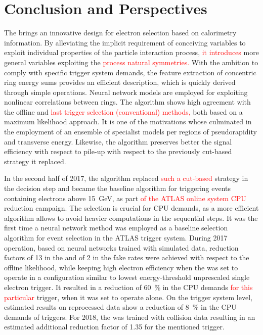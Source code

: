 \chapter{Conclusion and Perspectives}\label{sec:conclusion}






The \rnn{} brings an innovative design for electron selection based on
calorimetry information. By alleviating the implicit requirement of conceiving
variables to exploit individual properties of the particle interaction process, \textcolor{red}{it introduces} 
more general variables exploiting the \textcolor{red}{process natural symmetries.} With the
ambition to comply with specific trigger system demands, the feature extraction
of concentric ring energy sums provides an efficient description, which is quickly derived
through simple operations. Neural network models are employed for exploiting
nonlinear correlations between rings. The algorithm shows
high agreement with the offline and \textcolor{red}{last trigger selection (conventional) methods,} both based
on a maximum likelihood approach. It is one of the motivations whose culminated
in the employment of an ensemble of specialist models per regions of
pseudorapidity and transverse energy. Likewise, the \rnn{} algorithm preserves
better the signal efficiency with respect to pile-up with respect to the
previously cut-based strategy it replaced.



In the second half of 2017, the \rnn{} algorithm replaced \textcolor{red}{such a cut-based} strategy
in the \fastcalo{} decision step and became the baseline algorithm
for triggering events containing electrons above \SI{15}{\GeV}, as part \textcolor{red}{of the ATLAS online system CPU} reduction campaign. The \fastcalo{} selection is crucial for CPU demands, as a more
efficient algorithm allows to avoid heavier computations in the
sequential steps.  It was the first time a neural network method was employed as
a baseline selection algorithm for event selection in the ATLAS trigger system.
During 2017 operation, based on neural networks trained with simulated data,
reduction factors of 13 in the \fastcalo{} and of 2 in
the \hlt{} fake rates were achieved with respect to the offline likelihood, while
keeping high electron efficiency when the \rnn{} was set to operate in a
configuration similar to lowest energy-threshold unprescaled single electron
trigger. It resulted in a reduction of \SI{60}{\%} in the CPU demands \textcolor{red}{for this particular} trigger, when it was set to operate alone. On the trigger system level,
estimated results on reprocessed data show a reduction of \SI{8}{\%} in the CPU
demands of \egamma{} triggers. For 2018, the \rnn{} was trained with collision
data resulting in an estimated additional reduction factor of 1.35 for the
mentioned trigger.

